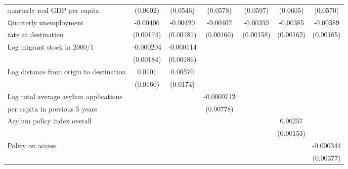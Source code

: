 \begin{table}[!ht]
\begin{tabular}{l*{6}{c}}
quarterly real GDP per capita                    &    (0.0602)         &    (0.0546)         &    (0.0578)         &    (0.0597)         &    (0.0605)         &    (0.0570)         \\
[0,5em]
Quarterly unemployment &    -0.00406\sym{*}  &    -0.00420\sym{*}  &    -0.00402\sym{*}  &    -0.00359\sym{*}  &    -0.00385\sym{*}  &    -0.00389\sym{*}  \\
rate at destination                    &   (0.00174)         &   (0.00181)         &   (0.00160)         &   (0.00158)         &   (0.00162)         &   (0.00165)         \\
[0,5em]
Log migrant stock in 2000/1&   -0.000204         &   -0.000114         &                     &                     &                     &                     \\
                    &   (0.00184)         &   (0.00186)         &                     &                     &                     &                     \\
[0,5em]
Log distance from origin to destination&      0.0101         &     0.00570         &                     &                     &                     &                     \\
                    &    (0.0160)         &    (0.0174)         &                     &                     &                     &                     \\
[0,5em]
Log total average asylum applications &                     &                     &  -0.0000712         &                     &                     &                     \\
per capita in previous 5 years                    &                     &                     &   (0.00778)         &                     &                     &                     \\
[0,5em]
Asylum policy index overall&                     &                     &                     &                     &     0.00257         &                     \\
                    &                     &                     &                     &                     &   (0.00153)         &                     \\
[0,5em]
Policy on access    &                     &                     &                     &                     &                     &   -0.000344         \\
                    &                     &                     &                     &                     &                     &   (0.00377)         \\

\end{tabular}
\end{table}

